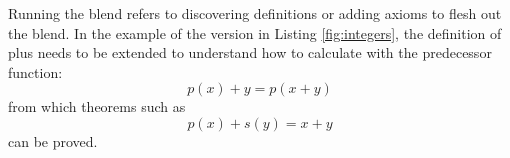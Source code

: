 Running the blend refers to discovering definitions or adding axioms
to flesh out the blend.  In the example of the version in Listing
\ref{fig:integers}, the definition of plus needs to be extended to
understand how to calculate with the predecessor function:
$$
p(x) + y = p(x+y)
$$
\noindent from which theorems such as 
$$
p(x) + s(y) = x+y
$$
\noindent can be proved.



